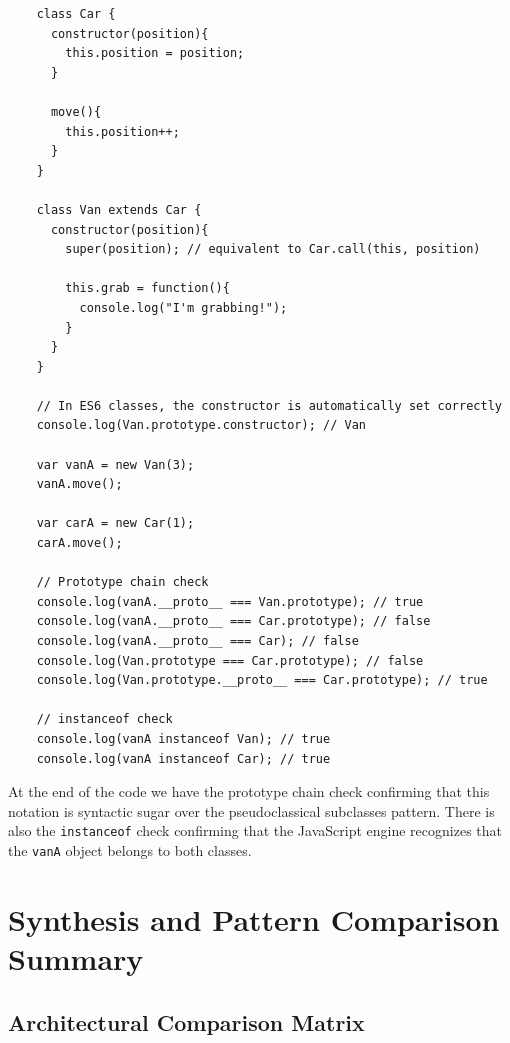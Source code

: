 \documentclass{scrbook}
\begin{document}
\begin{lstlisting}
    class Car {
      constructor(position){
        this.position = position;
      }
    
      move(){
        this.position++;
      }
    }
    
    class Van extends Car {
      constructor(position){
        super(position); // equivalent to Car.call(this, position)
    
        this.grab = function(){
          console.log("I'm grabbing!");
        }
      }
    }
    
    // In ES6 classes, the constructor is automatically set correctly
    console.log(Van.prototype.constructor); // Van
    
    var vanA = new Van(3);
    vanA.move();
    
    var carA = new Car(1);
    carA.move();
    
    // Prototype chain check
    console.log(vanA.__proto__ === Van.prototype); // true
    console.log(vanA.__proto__ === Car.prototype); // false
    console.log(vanA.__proto__ === Car); // false
    console.log(Van.prototype === Car.prototype); // false
    console.log(Van.prototype.__proto__ === Car.prototype); // true
    
    // instanceof check
    console.log(vanA instanceof Van); // true
    console.log(vanA instanceof Car); // true
\end{lstlisting}

At the end of the code we have the prototype chain check confirming that this notation is syntactic sugar over the pseudoclassical subclasses pattern. There is also the \texttt{instanceof} check confirming that the JavaScript engine recognizes that the \texttt{vanA} object belongs to both classes.

\section{Synthesis and Pattern Comparison Summary}

\subsection{Architectural Comparison Matrix}
\end{document}
